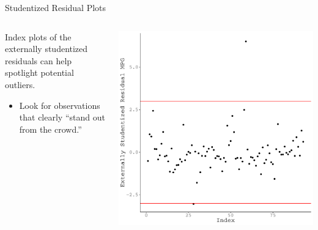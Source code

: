 \documentclass{beamer}\usepackage[]{graphicx}\usepackage[]{color}
\makeatletter
\def\maxwidth{ %
  \ifdim\Gin@nat@width>\linewidth
    \linewidth
  \else
    \Gin@nat@width
  \fi
}
\newenvironment{knitrout}{}{} %
\makeatother
\begin{document}
\watermarkoff %

\begin{frame}{Studentized Residual Plots}
  
  \begin{columns}
    \begin{column}{0.5\textwidth}
      
      Index plots of the externally studentized residuals can help spotlight 
      potential outliers.
      \vb
      \begin{itemize}
      \item Look for observations that clearly ``stand out from the crowd.''
      \end{itemize}
      
    \end{column}
    
    \begin{column}{0.5\textwidth}
\begin{knitrout}\footnotesize
{}\color{fgcolor}

{\centering \includegraphics[width=\maxwidth]{figure/unnamed-chunk-28-1} 

}



\end{knitrout}

\end{column}
\end{columns}

\end{frame}
\end{document}
